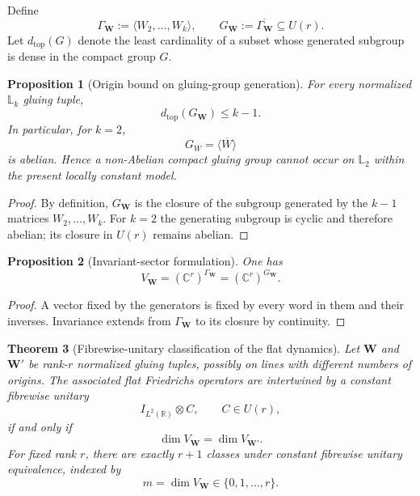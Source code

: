 \documentclass[11pt]{article}
\theoremstyle{plain}
\newtheorem{theorem}{Theorem}[section]
\newtheorem{proposition}[theorem]{Proposition}
\theoremstyle{definition}
\newcommand{\R}{\mathbb{R}}
\newcommand{\C}{\mathbb{C}}
\newcommand{\Ltwo}{\mathbb{L}_{2}}
\begin{document}
Define
\[
\Gamma_{\mathbf W}:=\langle W_2,\ldots,W_k\rangle,
\qquad
G_{\mathbf W}:=\overline{\Gamma_{\mathbf W}}\subseteq U(r).
\]
Let \(d_{\mathrm{top}}(G)\) denote the least cardinality of a subset whose generated subgroup is dense in the compact group \(G\).

\begin{proposition}[Origin bound on gluing-group generation]
\label{prop:generator-bound}
For every normalized \(\mathbb L_k\) gluing tuple,
\[
d_{\mathrm{top}}(G_{\mathbf W})\leq k-1.
\]
In particular, for \(k=2\),
\[
G_W=\overline{\langle W\rangle}
\]
is abelian. Hence a non-Abelian compact gluing group cannot occur on \(\Ltwo\) within the present locally constant model.
\end{proposition}

\begin{proof}
By definition, \(G_{\mathbf W}\) is the closure of the subgroup generated by the \(k-1\) matrices
\(W_2,\ldots,W_k\). For \(k=2\) the generating subgroup is cyclic and therefore abelian; its closure in \(U(r)\) remains abelian.
\end{proof}

\begin{proposition}[Invariant-sector formulation]
\label{prop:group-invariant}
One has
\[
V_{\mathbf W}
=
(\C^r)^{\Gamma_{\mathbf W}}
=
(\C^r)^{G_{\mathbf W}}.
\]
\end{proposition}

\begin{proof}
A vector fixed by the generators is fixed by every word in them and their inverses. Invariance extends from \(\Gamma_{\mathbf W}\) to its closure by continuity.
\end{proof}

\begin{theorem}[Fibrewise-unitary classification of the flat dynamics]
\label{thm:dimension-classification}
Let \(\mathbf W\) and \(\mathbf W'\) be rank-\(r\) normalized gluing tuples, possibly on lines with different numbers of origins. The associated flat Friedrichs operators are intertwined by a constant fibrewise unitary
\[
I_{L^2(\R)}\otimes C,
\qquad C\in U(r),
\]
if and only if
\[
\dim V_{\mathbf W}=\dim V_{\mathbf W'}.
\]
For fixed rank \(r\), there are exactly \(r+1\) classes under constant fibrewise unitary equivalence, indexed by
\[
m=\dim V_{\mathbf W}\in\{0,1,\ldots,r\}.
\]
\end{theorem}
\end{document}
